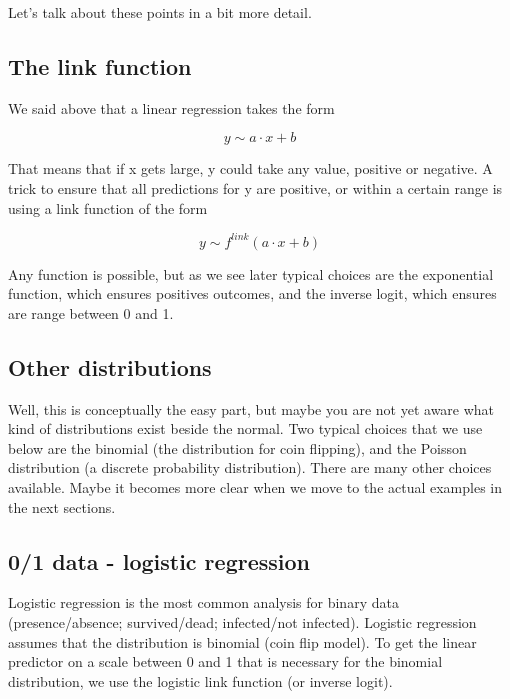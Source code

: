 \documentclass[a4paper,twoside]{tufte-book}\usepackage[]{graphicx}\usepackage[]{color}
\begin{document}
Let's talk about these points in a bit more detail.

\subsection{The link function}

We said above that a linear regression takes the form 

\begin{equation}
y \sim a \cdot x + b 
\end{equation}

That means that if x gets large, y could take any value, positive or negative. A trick to ensure that all predictions for y are positive, or within a certain range is using a link function of the form 

\begin{equation}
y \sim f^{link}(a \cdot x + b )
\end{equation}

Any function is possible, but as we see later typical choices are the exponential function, which ensures positives outcomes, and the inverse logit, which ensures are range between 0 and 1.

\subsection{Other distributions}

Well, this is conceptually the easy part, but maybe you are not yet aware what kind of distributions exist beside the normal. Two typical choices that we use below are the binomial (the distribution for coin flipping), and the Poisson distribution (a discrete probability distribution). There are many other choices available. Maybe it becomes more clear when we move to the actual examples in the next sections. 

\subsection{0/1 data - logistic regression}

Logistic regression is the most common analysis for binary data (presence/absence; survived/dead; infected/not infected). Logistic regression assumes that the distribution is binomial (coin flip model). To get the linear predictor on a scale between 0 and 1 that is necessary for the binomial distribution, we use the logistic link function (or inverse logit). 
\end{document}
